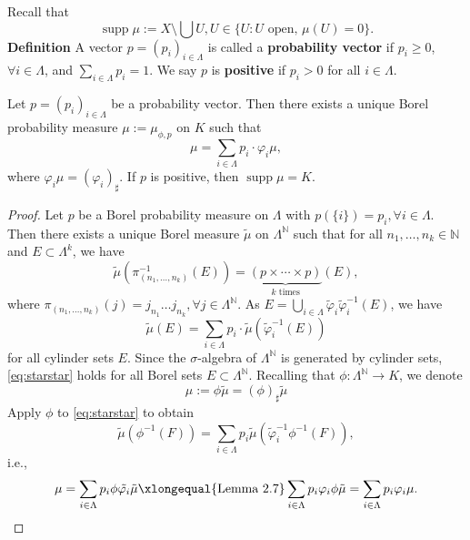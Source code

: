 Recall that
\[
\operatorname{supp}\mu:= X\setminus \bigcup U, U\in \{ U: U \text{ open, }\mu(U)=0 \}.
\]
\textbf{Definition} A vector $p=(p_{i})_{i\in \Lambda}$ is called a \textbf{probability vector} if $p_{i}\geq 0$, $\forall i \in \Lambda$, and $\displaystyle \sum _{i \in \Lambda}p_{i}=1$. We say $p$ is \textbf{positive} if $p_{i}>0$ for all $i \in \Lambda$.

\begin{theorem}\label{thm:2.8}
Let $p=(p_{i})_{i \in \Lambda}$ be a probability vector. Then there exists a unique Borel probability measure $\mu:=\mu _{\phi,p}$ on $K$ such that
\[
\mu=\sum _{i \in \Lambda}p_{i}\cdot \varphi _{i}\mu,
\]
where $\varphi _{i}\mu=(\varphi _{i})_{\sharp}$. If $p$ is positive, then $\operatorname{supp}\mu=K$.
\end{theorem}

\begin{proof}
Let $p$ be a Borel probability measure on $\Lambda$ with $p(\{ i \})=p_{i}, \forall i \in \Lambda$. Then there exists a unique Borel measure $\tilde{\mu}$ on $\Lambda ^{\mathbb{N}}$ such that for all $n_{1},\dots,n_{k}\in \mathbb{N}$ and $E\subset \Lambda ^{k}$, we have
\[
\tilde{\mu}(\pi ^{-1}_{(n_{1},\dots,n_{k})}(E))=\underbrace{(p\times \cdots\times p)}_{k \text{ times}}(E),
\]
where $\pi _{(n_{1},\dots,n_{k})}(j)=j_{n_{1}}\dots j_{n_{k}},\forall j \in \Lambda ^{\mathbb{N}}$. As $\displaystyle E=\bigcup _{i \in \Lambda}\tilde{\varphi}_{i}\tilde{\varphi}_{i}^{-1}(E)$, we have
\begin{equation}\label{eq:starstar}
\tilde{\mu}(E)=\sum _{i \in \Lambda}p_{i}\cdot \tilde{\mu}(\tilde{\varphi}_{i}^{-1}(E))
\end{equation}
for all cylinder sets $E$. Since the $\sigma$-algebra of $\Lambda ^{\mathbb{N}}$ is generated by cylinder sets, \eqref{eq:starstar} holds for all Borel sets $E\subset \Lambda ^{\mathbb{N}}$. Recalling that $\phi:\Lambda ^{\mathbb{N}}\to K$, we denote
\[\mu:= \phi  \tilde{\mu}=(\phi)_{\sharp}\tilde{\mu}\]
Apply $\phi$ to \eqref{eq:starstar} to obtain
\[
\tilde{\mu}(\phi ^{-1}(F))=\sum _{i \in \Lambda}p_{i} \tilde{\mu}(\tilde{\varphi}_{i}^{-1}\phi ^{-1}(F)),
\]
i.e.,
\[
\mu=\sum _{i \in \Lambda}p_{i}\phi  \tilde{\varphi _{i}}\tilde{\mu}
\xlongequal{\text{Lemma 2.7}}\sum _{i \in \Lambda}p_{i}\varphi _{i}\phi  \tilde{\mu}
=\sum _{i \in \Lambda}p_{i} \varphi _{i}\mu.\qedhere
\]
\end{proof}